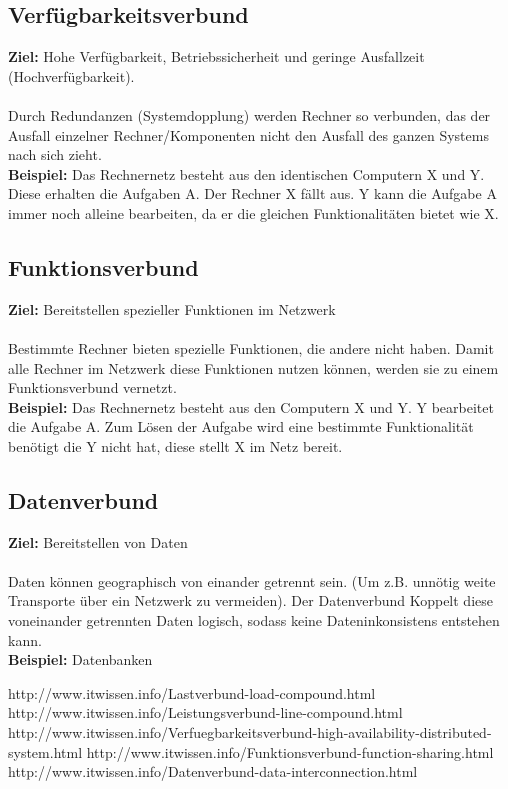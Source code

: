 \documentclass[12pt,a4paper,oneside,german]{article}
\begin{document}
	\subsection{Verfügbarkeitsverbund}
		\textbf{Ziel:} Hohe Verfügbarkeit, Betriebssicherheit und geringe Ausfallzeit (Hochverfügbarkeit). \\\\
		Durch Redundanzen (Systemdopplung) werden Rechner so verbunden, das der Ausfall einzelner Rechner/Komponenten nicht den Ausfall des ganzen Systems nach sich zieht. \cite{Verfuegbarkeitsv}\\
		\textbf{Beispiel:} Das Rechnernetz besteht aus den identischen Computern X und Y. Diese erhalten die Aufgaben A.
		Der Rechner X fällt aus. Y kann die Aufgabe A immer noch alleine bearbeiten, da er die gleichen Funktionalitäten bietet wie X.
	
	\subsection{Funktionsverbund}
		\textbf{Ziel:} Bereitstellen spezieller Funktionen im Netzwerk\\\\
		Bestimmte Rechner bieten spezielle Funktionen, die andere nicht haben.
		Damit alle Rechner im Netzwerk diese Funktionen nutzen können, werden sie zu einem Funktionsverbund vernetzt.\cite{Funktionsv}\\
		\textbf{Beispiel:} Das Rechnernetz besteht aus den Computern X und Y. Y bearbeitet die Aufgabe A.
		Zum Lösen der Aufgabe wird eine bestimmte Funktionalität benötigt die Y nicht hat, diese stellt X im Netz bereit.
	\subsection{Datenverbund}
		\textbf{Ziel:} Bereitstellen von Daten \\\\
		Daten können geographisch von einander getrennt sein. (Um z.B. unnötig weite Transporte über ein Netzwerk zu vermeiden).
		Der Datenverbund Koppelt diese voneinander getrennten Daten logisch, sodass keine Dateninkonsistens entstehen kann.\\
		\textbf{Beispiel:} Datenbanken
		


\begin{thebibliography}{}
	 http://www.itwissen.info/Lastverbund-load-compound.html
	 http://www.itwissen.info/Leistungsverbund-line-compound.html
	 http://www.itwissen.info/Verfuegbarkeitsverbund-high-availability-distributed-system.html
	  http://www.itwissen.info/Funktionsverbund-function-sharing.html
	 http://www.itwissen.info/Datenverbund-data-interconnection.html
\end{thebibliography}
\end{document}
